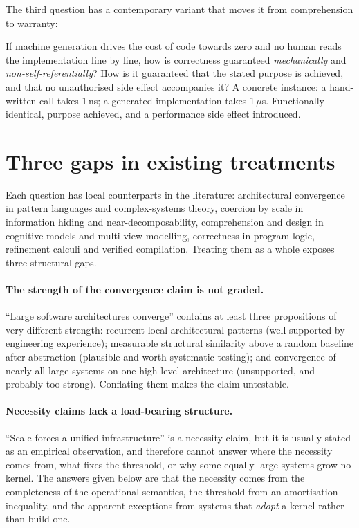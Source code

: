 The third question has a contemporary variant that moves it from comprehension to
warranty:

\begin{problem}\label{prob:trust}
If machine generation drives the cost of code towards zero and no human reads the
implementation line by line, how is correctness guaranteed \emph{mechanically} and
\emph{non-self-referentially}? How is it guaranteed that the stated purpose is achieved,
and that no unauthorised side effect accompanies it? A concrete instance: a hand-written
call takes 1\,ns; a generated implementation takes 1\,$\mu$s. Functionally identical,
purpose achieved, and a performance side effect introduced.
\end{problem}

\section{Three gaps in existing treatments}

Each question has local counterparts in the literature: architectural convergence in
pattern languages and complex-systems theory, coercion by scale in information hiding and
near-decomposability, comprehension and design in cognitive models and multi-view
modelling, correctness in program logic, refinement calculi and verified compilation.
Treating them as a whole exposes three structural gaps.

\paragraph{The strength of the convergence claim is not graded.}
``Large software architectures converge'' contains at least three propositions of very
different strength: recurrent local architectural patterns (well supported by engineering
experience); measurable structural similarity above a random baseline after abstraction
(plausible and worth systematic testing); and convergence of nearly all large systems on
one high-level architecture (unsupported, and probably too strong). Conflating them makes
the claim untestable.

\paragraph{Necessity claims lack a load-bearing structure.}
``Scale forces a unified infrastructure'' is a necessity claim, but it is usually stated
as an empirical observation, and therefore cannot answer where the necessity comes from,
what fixes the threshold, or why some equally large systems grow no kernel. The answers
given below are that the necessity comes from the completeness of the operational
semantics, the threshold from an amortisation inequality, and the apparent exceptions
from systems that \emph{adopt} a kernel rather than build one.

